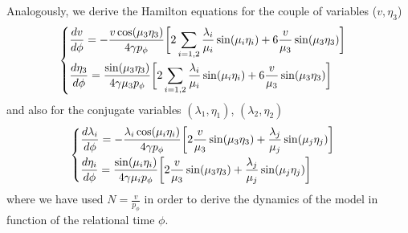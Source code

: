 \documentclass[aps,prd,twocolumn,nofootinbib,superscriptaddress]{revtex4-2}
\begin{document}
Analogously, we derive the Hamilton equations for the couple of variables ($v,\eta_{3}$)
\begin{equation}
		\label{vphi}
		\begin{cases}
				\begin{aligned}
	&\frac{dv}{d\phi}=-{{v\cos(\mu_3\eta_3)}\over 4\gamma p_{\phi}}\bigg[2\sum_{i=1,2}{\lambda_i\over{\mu_i}}\sin(\mu_i\eta_i)+6{v\over{\mu_3}}\sin(\mu_3\eta_3)\bigg]\\
	&\frac{d\eta_3}{d\phi}={\sin(\mu_3\eta_3)\over{4\gamma\mu_3p_{\phi}}}\bigg[2\sum_{i=1,2}{\lambda_i\over{\mu_i}}\sin(\mu_i\eta_i)+6{v\over{\mu_3}}\sin(\mu_3\eta_3)\bigg]
	\end{aligned}
\end{cases}
\end{equation}
and also for the conjugate variables $(\lambda_1,\eta_1)$, $(\lambda_2,\eta_2)$
\begin{equation}
	\begin{cases}
	\begin{aligned}
	&\frac{d\lambda_i}{d\phi}=-{{\lambda_i\cos(\mu_i\eta_i)}\over 4\gamma p_{\phi}}\bigg[2{v\over{\mu_3}}\sin(\mu_3\eta_3)+{\lambda_{j}\over{\mu_j}}\sin(\mu_j\eta_j)\bigg]\\
	&\frac{d\eta_i}{d\phi}={\sin(\mu_i\eta_i)\over{4\gamma\mu_ip_{\phi}}}\bigg[2{v\over{\mu_3}}\sin(\mu_3\eta_3)+{\lambda_{j}\over{\mu_j}}\sin(\mu_j\eta_j)\bigg]
	\end{aligned}
\end{cases}
\end{equation}
where we have used
$N=\frac{v}{p_\phi}$
in order to derive the dynamics of the model in function of the relational time $\phi$.
\end{document}
